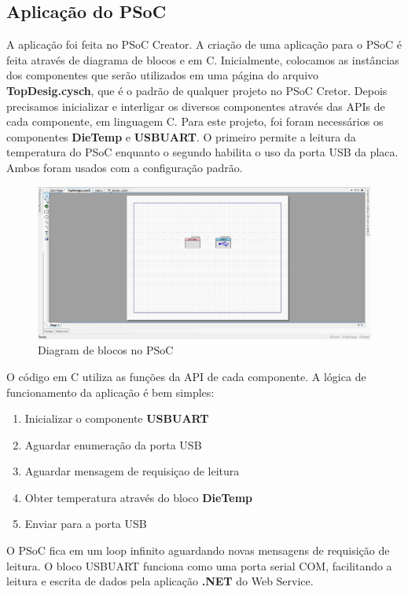 \documentclass[a4paper,12pt,titlepage]{article}
\begin{document}
	\subsection{Aplicação do PSoC}
		A aplicação foi feita no PSoC Creator. A criação de uma aplicação para o PSoC é feita através de diagrama de blocos e em C. Inicialmente, colocamos as instâncias dos componentes que serão utilizados em uma página do arquivo \textbf{TopDesig.cysch}, que é o padrão de qualquer projeto no PSoC Cretor. Depois precisamos inicializar e interligar os diversos componentes através das APIs de cada componente, em linguagem C. Para este projeto, foi foram necessários os componentes \textbf{DieTemp} e \textbf{USBUART}. O primeiro permite a leitura da temperatura do PSoC enquanto o segundo habilita o uso da porta USB da placa. Ambos foram usados com a configuração padrão.
			\begin{figure}[h!]
				\centering
				\includegraphics[width=0.8\linewidth]{psoc1}
				\caption{Diagram de blocos no PSoC}
				\label{fig:psoc1}
			\end{figure}
		
		O código em C utiliza as funções da API de cada componente. A lógica de funcionamento da aplicação é bem simples:
			\begin{enumerate}
				\item Inicializar o componente \textbf{USBUART}
				\item Aguardar enumeração da porta USB
				\item Aguardar mensagem de requisiçao de leitura
				\item Obter temperatura através do bloco \textbf{DieTemp}
				\item Enviar para a porta USB				  
			\end{enumerate}
		O PSoC fica em um loop infinito aguardando novas mensagens de requisição de leitura. O bloco USBUART funciona como uma porta serial COM, facilitando a leitura e escrita de dados pela aplicação \textbf{.NET} do Web Service. 
		
\end{document}
